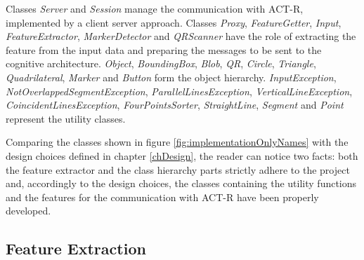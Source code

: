 	Classes \emph{Server} and \emph{Session} manage the communication with \mbox{ACT-R}, implemented by a client server approach.
	Classes \emph{Proxy}, \emph{FeatureGetter}, \emph{Input}, \emph{FeatureExtractor}, \emph{MarkerDetector} and \emph{QRScanner} have the role of extracting the feature from the input data and preparing the messages to be sent to the cognitive architecture.
	\emph{Object}, \emph{BoundingBox}, \emph{Blob}, \emph{QR}, \emph{Circle}, \emph{Triangle}, \emph{Quadrilateral}, \emph{Marker} and \emph{Button} form the object hierarchy.
	\emph{InputException}, \emph{NotOverlappedSegmentException}, \emph{ParallelLinesException}, \emph{VerticalLineException}, \emph{CoincidentLinesException}, \emph{FourPointsSorter}, \emph{StraightLine}, \emph{Segment} and \emph{Point} represent the utility classes.
	
	Comparing the classes shown in figure \ref{fig:implementationOnlyNames} with the design choices defined in chapter \ref{chDesign}, the reader can notice two facts: both the feature extractor and the class hierarchy parts strictly adhere to the project and, accordingly to the design choices, the classes containing the utility functions and the features for the communication with \mbox{ACT-R} have been properly developed.

	\subsection{Feature Extraction}
	
